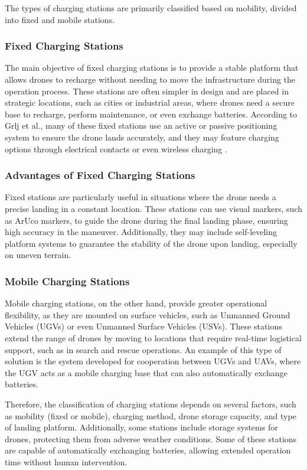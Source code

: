     The types of charging stations are primarily classified based on mobility, divided into fixed and mobile stations.

    \subsubsection{Fixed Charging Stations}
    The main objective of fixed charging stations is to provide a stable platform that allows drones to recharge without needing to move the infrastructure during the operation process. These stations are often simpler in design and are placed in strategic locations, such as cities or industrial areas, where drones need a secure base to recharge, perform maintenance, or even exchange batteries. According to Grlj et al., many of these fixed stations use an active or passive positioning system to ensure the drone lands accurately, and they may feature charging options through electrical contacts or even wireless charging \cite{}.

    \subsubsection{Advantages of Fixed Charging Stations}
    Fixed stations are particularly useful in situations where the drone needs a precise landing in a constant location. These stations can use visual markers, such as ArUco markers, to guide the drone during the final landing phase, ensuring high accuracy in the maneuver. Additionally, they may include self-leveling platform systems to guarantee the stability of the drone upon landing, especially on uneven terrain.

    \subsubsection{Mobile Charging Stations}
    Mobile charging stations, on the other hand, provide greater operational flexibility, as they are mounted on surface vehicles, such as Unmanned Ground Vehicles (UGVs) or even Unmanned Surface Vehicles (USVs). These stations extend the range of drones by moving to locations that require real-time logistical support, such as in search and rescue operations. An example of this type of solution is the system developed for cooperation between UGVs and UAVs, where the UGV acts as a mobile charging base that can also automatically exchange batteries.

    Therefore, the classification of charging stations depends on several factors, such as mobility (fixed or mobile), charging method, drone storage capacity, and type of landing platform. Additionally, some stations include storage systems for drones, protecting them from adverse weather conditions. Some of these stations are capable of automatically exchanging batteries, allowing extended operation time without human intervention.

